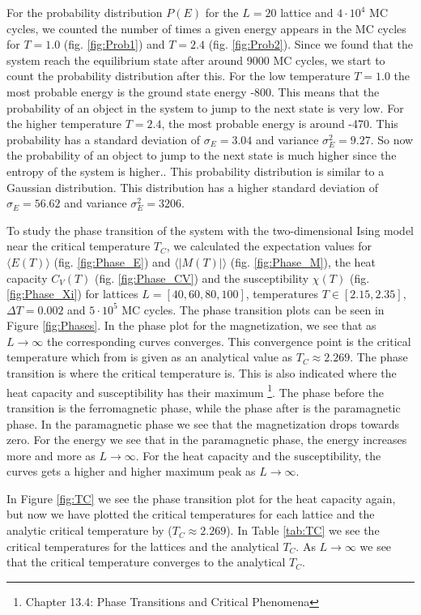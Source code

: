 \documentclass[12pt,a4paper,english]{article}
\begin{document}
For the probability distribution $P(E)$ for the $L=20$ lattice and $4\cdot10^4$ MC cycles, we counted the number of times a given energy appears in the MC cycles for $T=1.0$ (fig. \ref{fig:Prob1}) and $T=2.4$ (fig. \ref{fig:Prob2}). Since we found that the system reach the equilibrium state after around 9000 MC cycles, we start to count the probability distribution after this. For the low temperature $T=1.0$ the most probable energy is the ground state energy -800. This means that the probability of an object in the system to jump to the next state is very low. For the higher temperature $T=2.4$, the most probable energy is around -470. This probability has a standard deviation of $\sigma_E=3.04$ and variance $\sigma_E^2=9.27$. So now the probability of an object to jump to the next state is much higher since the entropy of the system is higher.. This probability distribution is similar to a Gaussian distribution. This distribution has a higher standard deviation of $\sigma_E=56.62$ and variance $\sigma_E^2=3206$.

To study the phase transition of the system with the two-dimensional Ising model near the critical temperature $T_C$, we calculated the expectation values for $\langle E(T)\rangle$ (fig. \ref{fig:Phase_E}) and $\langle |M(T)|\rangle$ (fig. \ref{fig:Phase_M}), the heat capacity $C_V(T)$ (fig. \ref{fig:Phase_CV}) and the susceptibility $\chi(T)$ (fig. \ref{fig:Phase_Xi}) for lattices $L=[40,60,80,100]$, temperatures $T\in[2.15,2.35]$, $\Delta T=0.002$ and $5\cdot10^5$ MC cycles. The phase transition plots can be seen in Figure \ref{fig:Phases}. In the phase plot for the magnetization, we see that as $L\rightarrow\infty$ the corresponding curves converges. This convergence point is the critical temperature which from \citet{PhysRev.65.117} is given as an analytical value as $T_C\approx2.269$. The phase transition is where the critical temperature is. This is also indicated where the heat capacity and susceptibility has their maximum \cite{ComPhys}\footnote{Chapter 13.4: Phase Transitions and Critical Phenomena}. The phase before the transition is the ferromagnetic phase, while the phase after is the paramagnetic phase. In the paramagnetic phase we see that the magnetization drops towards zero. For the energy we see that in the paramagnetic phase, the energy increases more and more as $L\rightarrow\infty$. For the heat capacity and the susceptibility, the curves gets a higher and higher maximum peak as $L\rightarrow\infty$.

In Figure \ref{fig:TC} we see the phase transition plot for the heat capacity again, but now we have plotted the critical temperatures for each lattice and the analytic critical temperature by \citet{PhysRev.65.117} ($T_C\approx2.269$). In Table \ref{tab:TC} we see the critical temperatures for the lattices and the analytical $T_C$. As $L\rightarrow\infty$ we see that the critical temperature converges to the analytical $T_C$. 
\end{document}
